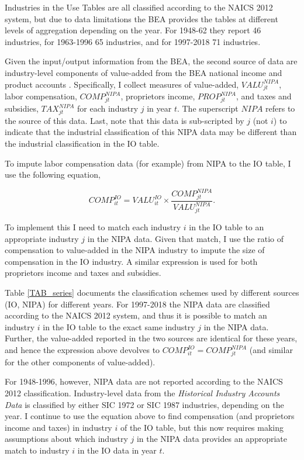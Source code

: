 \documentclass[11pt]{article}
\begin{document}
Industries in the Use Tables are all classified according to the NAICS 2012 system, but due to data limitations the BEA provides the tables at different levels of aggregation depending on the year. For 1948-62 they report 46 industries, for 1963-1996 65 industries, and for 1997-2018 71 industries. 

Given the input/output information from the BEA, the second source of data are industry-level components of value-added from the BEA national income and product accounts \citep{beasection6,beahistind}. Specifically, I collect measures of value-added, $VALU_{jt}^{NIPA}$, labor compensation, $COMP_{jt}^{NIPA}$, proprietors income, $PROP_{jt}^{NIPA}$, and taxes and subsidies, $TAX_{jt}^{NIPA}$ for each industry $j$ in year $t$. The superscript $NIPA$ refers to the source of this data. Last, note that this data is sub-scripted by $j$ (not $i$) to indicate that the industrial classification of this NIPA data may be different than the industrial classification in the IO table.

To impute labor compensation data (for example) from NIPA to the IO table, I use the following equation,

\begin{equation}
	COMP_{it}^{IO} = VALU_{it}^{IO} \times \frac{COMP_{jt}^{NIPA}}{VALU_{jt}^{NIPA}}. \label{EQ_match}
\end{equation}

To implement this I need to match each industry $i$ in the IO table to an appropriate industry $j$ in the NIPA data. Given that match, I use the ratio of compensation to value-added in the NIPA industry to impute the size of compensation in the IO industry. A similar expression is used for both proprietors income and taxes and subsidies. 

Table \ref{TAB_series} documents the classification schemes used by different sources (IO, NIPA) for different years. For 1997-2018 the NIPA data \citep{beasection6} are classified according to the NAICS 2012 system, and thus it is possible to match an industry $i$ in the IO table to the exact same industry $j$ in the NIPA data. Further, the value-added reported in the two sources are identical for these years, and hence the expression above devolves to $COMP_{it}^{IO} = COMP_{jt}^{NIPA}$ (and similar for the other components of value-added). 

For 1948-1996, however, NIPA data are not reported according to the NAICS 2012 classification. Industry-level data from the \textit{Historical Industry Accounts Data} \citep{beahistind} is classified by either SIC 1972 or SIC 1987 industries, depending on the year. I continue to use the equation above to find compensation (and proprietors income and taxes) in industry $i$ of the IO table, but this now requires making assumptions about which industry $j$ in the NIPA data provides an appropriate match to industry $i$ in the IO data in year $t$.
\end{document}
